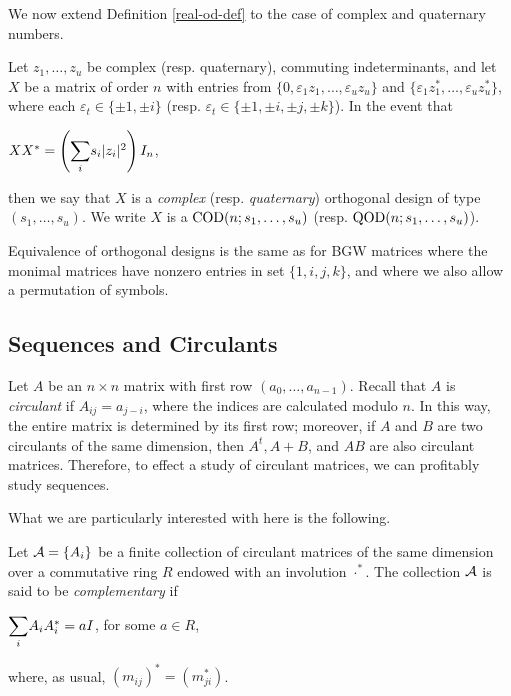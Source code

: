 \documentclass[../../../main]{subfiles}
\begin{document}
We now extend Definition \ref{real-od-def} to the case of complex and quaternary numbers.

\begin{defin}
  Let $z_1, \dots, z_u$ be complex (resp. quaternary), commuting indeterminants, and let $X$ be a matrix of order $n$ with entries from $\{0,\varepsilon_1z_1, \dots, \varepsilon_uz_u\}$ and $\{\varepsilon_1z_1^*, \dots, \varepsilon_uz_u^*\}$, where each $\varepsilon_t \in \{\pm 1, \pm i\}$ (resp. $\varepsilon_t \in \{\pm 1, \pm i, \pm j, \pm k\}$). In the event that
  \begin{defenum}
  \item\label{qod-od-def} $XX^* = \left( \ssum_is_i|z_i|^2 \right)I_n$,
  \end{defenum}
  then we say that $X$ is a {\it complex} (resp. {\it quaternary}) orthogonal design of type $(s_1,\dots,s_u)$. We write $X$ is a $\text{COD}(n;s_1,\dots,s_u)$ (resp. $\text{QOD}(n;s_1,\dots,s_u)$).
\end{defin}

Equivalence of orthogonal designs is the same as for BGW matrices where the
monimal matrices have nonzero entries in set $\{1,i,j,k\}$, and where we also
allow a permutation of symbols.

\dinkus


\subsection{Sequences and Circulants}

 Let $A$ be an $n \times n$ matrix with first row $(a_0,\dots,a_{n-1})$. Recall that $A$ is {\it circulant} if $A_{ij}=a_{j-i}$, where the indices are calculated modulo $n$. In this way, the entire matrix is determined by its first row; moreover, if $A$ and $B$ are two circulants of the same dimension, then $A^t,A+B$, and $AB$ are also circulant matrices. Therefore, to effect a study of circulant matrices, we can profitably study sequences. 
 
 What we are particularly interested with here is the following.
 
 \begin{defin}
  Let $\mathcal{A}=\{A_i\}$ be a finite collection of circulant matrices of the same dimension over a commutative ring $R$ endowed with an involution $\cdot^*$. The collection $\mathcal{A}$ is said to be {\it complementary} if
  \begin{defenum}
   \item $\ssum_i A_iA_i^* = aI$, for some $a \in R$,
  \end{defenum}
  where, as usual, $(m_{ij})^*=(m_{ji}^*)$.
 \end{defin}
 
\end{document}
